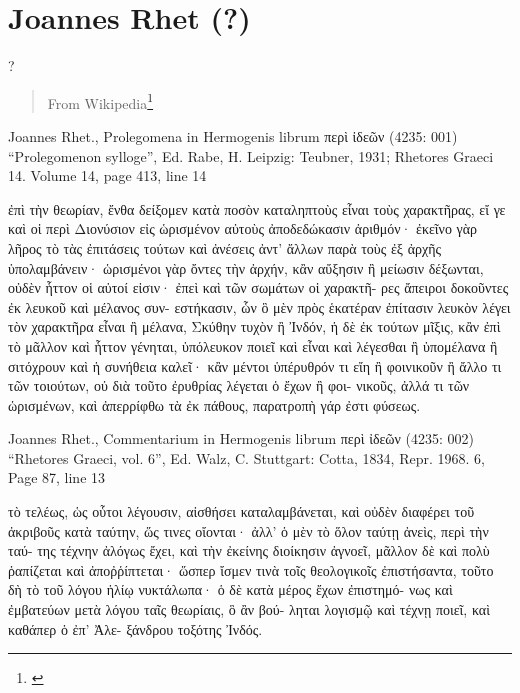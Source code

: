 \documentclass[12pt,letterpaper,twoside,final]{memoir}
\begin{document}
\section{Joannes Rhet (?)}
?
\blockquote[From Wikipedia\footnote{\url{}}]{}
\begin{greek}

Joannes Rhet., Prolegomena in Hermogenis librum περὶ ἰδεῶν (4235: 001)
“Prolegomenon sylloge”, Ed. Rabe, H.
Leipzig: Teubner, 1931; Rhetores Graeci 14.
Volume 14, page 413, line 14

ἐπὶ τὴν θεωρίαν, ἔνθα δείξομεν κατὰ ποσὸν καταληπτοὺς 
εἶναι τοὺς χαρακτῆρας, εἴ γε καὶ οἱ περὶ Διονύσιον εἰς 
ὡρισμένον αὐτοὺς ἀποδεδώκασιν ἀριθμόν· ἐκεῖνο γὰρ 
λῆρος τὸ τὰς ἐπιτάσεις τούτων καὶ ἀνέσεις ἀντ' ἄλλων 
παρὰ τοὺς ἐξ ἀρχῆς ὑπολαμβάνειν· ὡρισμένοι γὰρ ὄντες 
τὴν ἀρχήν, κἂν αὔξησιν ἢ μείωσιν δέξωνται, οὐδὲν 
ἧττον οἱ αὐτοί εἰσιν· ἐπεὶ καὶ τῶν σωμάτων οἱ χαρακτῆ-
ρες ἄπειροι δοκοῦντες ἐκ λευκοῦ καὶ μέλανος συν-
εστήκασιν, ὧν ὃ μὲν πρὸς ἑκατέραν ἐπίτασιν λευκὸν 
λέγει τὸν χαρακτῆρα εἶναι ἢ μέλανα, Σκύθην τυχὸν ἢ 
Ἰνδόν, ἡ δὲ ἐκ τούτων μῖξις, κἂν ἐπὶ τὸ μᾶλλον καὶ 
ἧττον γένηται, ὑπόλευκον ποιεῖ καὶ εἶναι καὶ λέγεσθαι 
ἢ ὑπομέλανα ἢ σιτόχρουν καὶ ἡ συνήθεια καλεῖ· κἂν 
μέντοι ὑπέρυθρόν τι εἴη ἢ φοινικοῦν ἢ ἄλλο τι τῶν 
τοιούτων, οὐ διὰ τοῦτο ἐρυθρίας λέγεται ὁ ἔχων ἢ φοι-
νικοῦς, ἀλλά τι τῶν ὡρισμένων, καὶ ἀπερρίφθω τὰ ἐκ 
πάθους, παρατροπὴ γάρ ἐστι φύσεως. 



Joannes Rhet., Commentarium in Hermogenis librum περὶ ἰδεῶν (4235: 002)
“Rhetores Graeci, vol. 6”, Ed. Walz, C.
Stuttgart: Cotta, 1834, Repr. 1968.
6, Page 87, line 13

τὸ τελέως, ὡς οὗτοι λέγουσιν, αἰσθήσει καταλαμβάνεται, 
καὶ οὐδὲν διαφέρει τοῦ ἀκριβοῦς κατὰ ταύτην, ὥς τινες 
οἴονται· ἀλλ' ὁ μὲν τὸ ὅλον ταύτῃ ἀνεὶς, περὶ τὴν ταύ-
της τέχνην ἀλόγως ἔχει, καὶ τὴν ἐκείνης διοίκησιν ἀγνοεῖ, 
μᾶλλον δὲ καὶ πολὺ ῥαπίζεται καὶ ἀποῤῥίπτεται· ὥσπερ 
ἴσμεν τινὰ τοῖς θεολογικοῖς ἐπιστήσαντα, τοῦτο δὴ τὸ τοῦ 
λόγου ἡλίῳ νυκτάλωπα· ὁ δὲ κατὰ μέρος ἔχων ἐπιστημό-
νως καὶ ἐμβατεύων μετὰ λόγου ταῖς θεωρίαις, ὃ ἂν βού-
ληται λογισμῷ καὶ τέχνῃ ποιεῖ, καὶ καθάπερ ὁ ἐπ' Ἀλε-
ξάνδρου τοξότης Ἰνδός. 

\end{greek}
\end{document}
